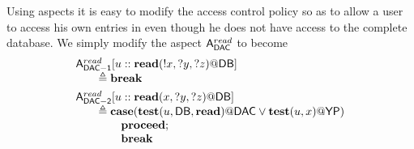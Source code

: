 \documentclass[a4paper]{llncs}
\begin{document}
\begin{example}
Using aspects it is easy to modify the access control policy so as to allow a user
to access his own entries in {\DBsec} even though he does not have access to the complete
database. We simply modify the aspect ${\sf A}_{\sf DAC}^{read}$ to become
$$
\begin{array}{l}\small
{\sf A}_{\sf DAC-1}^{read}[u::{\bf read}(!x,?y,?z)@{\DBsec}] \\
\qquad \triangleq {\bf break} \\[1ex]

{\sf A}_{\sf DAC-2}^{read}[u::{\bf read}(x,?y,?z)@{\DBsec}] \\
\qquad \triangleq  {\bf case}({\bf test}(u,{\DBsec},{\bf read})@{\sf DAC} \vee
               {\bf test}(u,x)@{\DBpub} )\\ 
\qquad \qquad {\bf proceed};\\
\qquad\qquad {\bf break} \\
\end{array}
$$
\end{example}


\end{document}
